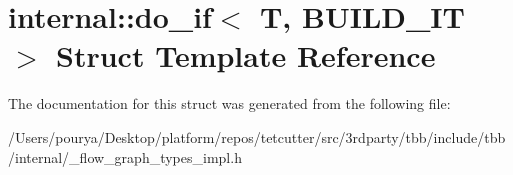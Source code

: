 \hypertarget{structinternal_1_1do__if}{}\section{internal\+:\+:do\+\_\+if$<$ T, B\+U\+I\+L\+D\+\_\+\+I\+T $>$ Struct Template Reference}
\label{structinternal_1_1do__if}


The documentation for this struct was generated from the following file\+:\begin{DoxyCompactItemize}
\item 
/\+Users/pourya/\+Desktop/platform/repos/tetcutter/src/3rdparty/tbb/include/tbb/internal/\+\_\+flow\+\_\+graph\+\_\+types\+\_\+impl.\+h\end{DoxyCompactItemize}

